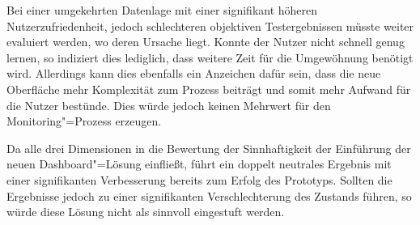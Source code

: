 Bei einer umgekehrten Datenlage mit einer signifikant höheren Nutzerzufriedenheit, jedoch schlechteren objektiven Testergebnissen müsste weiter evaluiert werden, wo deren Ursache liegt. Konnte der Nutzer nicht schnell genug lernen, so indiziert dies lediglich, dass weitere Zeit für die Umgewöhnung benötigt wird. Allerdings kann dies ebenfalls ein Anzeichen dafür sein, dass die neue Oberfläche mehr Komplexität zum Prozess beiträgt und somit mehr Aufwand für die Nutzer bestünde. Dies würde jedoch keinen Mehrwert für den Monitoring"=Prozess erzeugen.

Da alle drei Dimensionen in die Bewertung der Sinnhaftigkeit der Einführung der neuen Dash\-board"=Lösung einfließt, führt ein doppelt neutrales Ergebnis mit einer signifikanten Verbesserung bereits zum Erfolg des Prototyps. Sollten die Ergebnisse jedoch zu einer signifikanten Verschlechterung des Zustands führen, so würde diese Lösung nicht als sinnvoll eingestuft werden.

